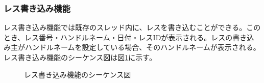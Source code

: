 \documentclass[a4j]{jarticle}
\begin{document}
  \subsubsection{レス書き込み機能}
  レス書き込み機能では既存のスレッド内に、レスを書き込むことができる。このとき、レス番号・ハンドルネーム・日付・レスIDが表示される。レスの書き込み主がハンドルネームを設定している場合、そのハンドルネームが表示される。
  レス書き込み機能のシーケンス図は図\ref{fig:bbs_res.png}に示す。
  \begin{figure}[H]
    \centering
    \caption{レス書き込み機能のシーケンス図}
    \label{fig:bbs_res.png}
  \end{figure}
\end{document}
